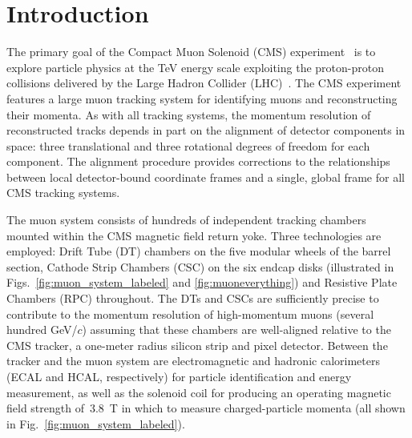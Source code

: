 \section{Introduction}

The primary goal of the Compact Muon Solenoid (CMS)
experiment~\cite{:2008zzk} is to explore particle physics at the TeV
energy scale exploiting the proton-proton collisions delivered by the
Large Hadron Collider (LHC)~\cite{Evans:2008zzb}.  The CMS experiment
features a large muon tracking system for identifying muons and
reconstructing their momenta.  As with all tracking systems, the
momentum resolution of reconstructed tracks depends in part on the
alignment of detector components in space: three translational and
three rotational degrees of freedom for each component.  The alignment
procedure provides corrections to the relationships between local
detector-bound coordinate frames and a single, global frame for all
CMS tracking systems.

The muon system consists of hundreds of independent tracking chambers
mounted within the CMS magnetic field return yoke.  Three technologies
are employed: Drift Tube (DT) chambers on the five modular wheels of
the barrel section, Cathode
Strip Chambers (CSC) on the six endcap disks (illustrated in
Figs.~\ref{fig:muon_system_labeled} and \ref{fig:muoneverything}) and
Resistive Plate Chambers (RPC) throughout.  The DTs and CSCs are
sufficiently precise to contribute to the momentum resolution of
high-momentum muons (several hundred GeV/$c$) assuming that these
chambers are well-aligned relative to the CMS tracker, a one-meter
radius silicon strip and pixel detector.  Between the tracker and the
muon system are electromagnetic and hadronic calorimeters (ECAL and
HCAL, respectively) for particle identification and energy
measurement, as well as the solenoid coil for producing an operating
magnetic field strength of~3.8~T in which to measure charged-particle
momenta (all shown in Fig.~\ref{fig:muon_system_labeled}).


